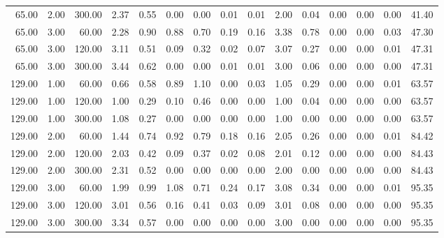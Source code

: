 \begin{table}[ht]
\begin{tabular}{rrrrrrrrrrrrrrr}
  65.00 & 2.00 & 300.00 & 2.37 & 0.55 & 0.00 & 0.00 & 0.01 & 0.01 & 2.00 & 0.04 & 0.00 & 0.00 & 0.00 & 41.40 \\ 
  65.00 & 3.00 & 60.00 & 2.28 & 0.90 & 0.88 & 0.70 & 0.19 & 0.16 & 3.38 & 0.78 & 0.00 & 0.00 & 0.03 & 47.30 \\ 
  65.00 & 3.00 & 120.00 & 3.11 & 0.51 & 0.09 & 0.32 & 0.02 & 0.07 & 3.07 & 0.27 & 0.00 & 0.00 & 0.01 & 47.31 \\ 
  65.00 & 3.00 & 300.00 & 3.44 & 0.62 & 0.00 & 0.00 & 0.01 & 0.01 & 3.00 & 0.06 & 0.00 & 0.00 & 0.00 & 47.31 \\ 
  129.00 & 1.00 & 60.00 & 0.66 & 0.58 & 0.89 & 1.10 & 0.00 & 0.03 & 1.05 & 0.29 & 0.00 & 0.00 & 0.01 & 63.57 \\ 
  129.00 & 1.00 & 120.00 & 1.00 & 0.29 & 0.10 & 0.46 & 0.00 & 0.00 & 1.00 & 0.04 & 0.00 & 0.00 & 0.00 & 63.57 \\ 
  129.00 & 1.00 & 300.00 & 1.08 & 0.27 & 0.00 & 0.00 & 0.00 & 0.00 & 1.00 & 0.00 & 0.00 & 0.00 & 0.00 & 63.57 \\ 
  129.00 & 2.00 & 60.00 & 1.44 & 0.74 & 0.92 & 0.79 & 0.18 & 0.16 & 2.05 & 0.26 & 0.00 & 0.00 & 0.01 & 84.42 \\ 
  129.00 & 2.00 & 120.00 & 2.03 & 0.42 & 0.09 & 0.37 & 0.02 & 0.08 & 2.01 & 0.12 & 0.00 & 0.00 & 0.00 & 84.43 \\ 
  129.00 & 2.00 & 300.00 & 2.31 & 0.52 & 0.00 & 0.00 & 0.00 & 0.00 & 2.00 & 0.00 & 0.00 & 0.00 & 0.00 & 84.43 \\ 
  129.00 & 3.00 & 60.00 & 1.99 & 0.99 & 1.08 & 0.71 & 0.24 & 0.17 & 3.08 & 0.34 & 0.00 & 0.00 & 0.01 & 95.35 \\ 
  129.00 & 3.00 & 120.00 & 3.01 & 0.56 & 0.16 & 0.41 & 0.03 & 0.09 & 3.01 & 0.08 & 0.00 & 0.00 & 0.00 & 95.35 \\ 
  129.00 & 3.00 & 300.00 & 3.34 & 0.57 & 0.00 & 0.00 & 0.00 & 0.00 & 3.00 & 0.00 & 0.00 & 0.00 & 0.00 & 95.35 \\ 
   \hline
\end{tabular}
\end{table}
